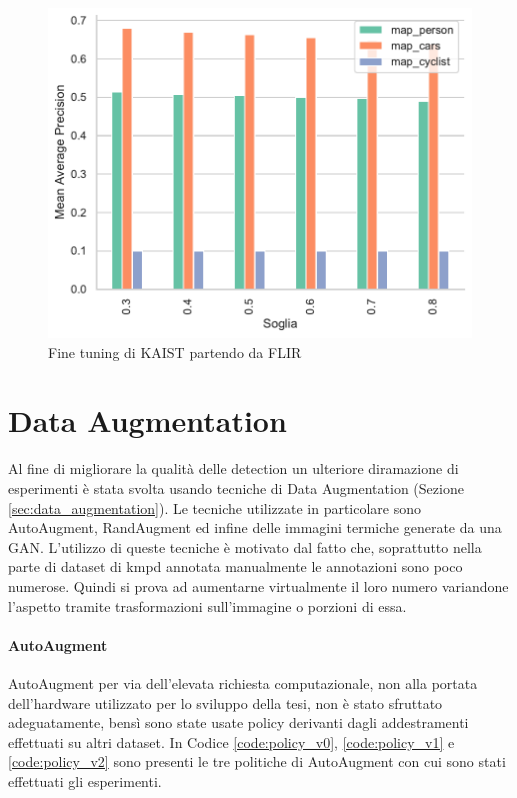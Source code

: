 \begin{figure}[]
    \centering
    \includegraphics[width=\textwidth]{images/graphic/graphics_map.pdf}
    \caption{Fine tuning di KAIST partendo da FLIR}
    \label{fig:test_kaist_ep8_map}
\end{figure}

\section{Data Augmentation}
\label{sec:data_augmentaion_experiment}
Al fine di migliorare la qualità delle detection un ulteriore diramazione di esperimenti è stata svolta usando tecniche di Data Augmentation (Sezione \ref{sec:data_augmentation}). Le tecniche utilizzate in particolare sono AutoAugment, RandAugment ed infine delle immagini termiche generate da una \ac{GAN}. L'utilizzo di queste tecniche è motivato dal fatto che, soprattutto nella parte di dataset di \ac{kmpd} annotata manualmente le annotazioni sono poco numerose. Quindi si prova ad aumentarne virtualmente il loro numero variandone l'aspetto tramite trasformazioni sull'immagine o porzioni di essa.
\paragraph{AutoAugment}
AutoAugment per via dell'elevata richiesta computazionale, non alla portata dell'hardware utilizzato per lo sviluppo della tesi, non è stato sfruttato adeguatamente, bensì sono state usate policy derivanti dagli addestramenti effettuati su altri dataset. In Codice \ref{code:policy_v0}, \ref{code:policy_v1} e \ref{code:policy_v2} sono presenti le tre politiche di AutoAugment con cui sono stati effettuati gli esperimenti.  

